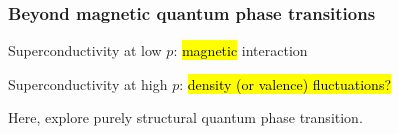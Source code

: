 \begin{frame}[label=CCSG]
\frametitle{Beyond
  magnetic quantum phase transitions}

\centerline{%
}


\vspace{-1.5ex}
\begin{center}
\begin{minipage}[t]{0.9\columnwidth}
\bi
\item<2->
Superconductivity at low $p$: \hl{magnetic} interaction
\item<2->
Superconductivity at high $p$: \hl{density (or valence) fluctuations?}
\item<3->
Here, explore purely structural quantum phase transition.
\ei
\end{minipage}
\end{center}

\end{frame}



